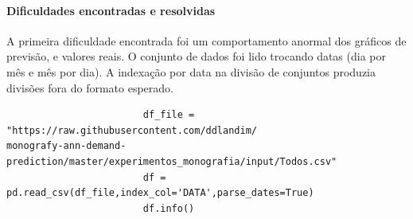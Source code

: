 \documentclass[	12pt, Times, openright, twoside, a4paper, english, brazil]{abntex2}
\begin{document}
    	        \paragraph{Dificuldades encontradas e resolvidas}
    	            A primeira dificuldade encontrada foi um comportamento anormal dos gráficos de previsão, e valores reais. O conjunto de dados foi lido trocando datas (dia por mês e mês por dia). A indexação por data na divisão de conjuntos produzia divisões fora do formato esperado.\newline
    	            \begin{lstlisting}
    	                df_file = "https://raw.githubusercontent.com/ddlandim/                                     monografy-ann-demand-prediction/master/experimentos_monografia/input/Todos.csv"
                        df = pd.read_csv(df_file,index_col='DATA',parse_dates=True)
                        df.info()
    	            \end{lstlisting}
    	            
\end{document}

